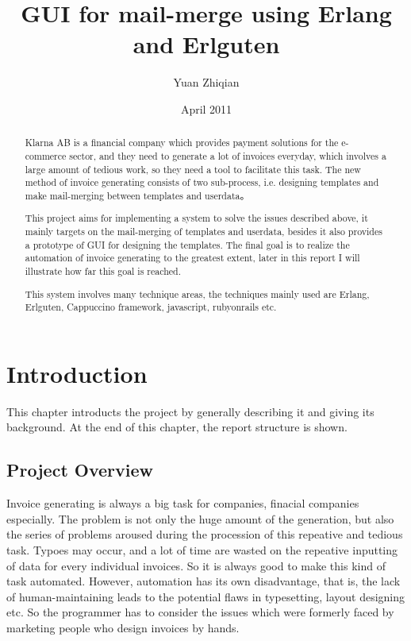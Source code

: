 \documentclass[12pt,twoside,a4paper]{report}
\begin{document}
\title{GUI for mail-merge using Erlang and Erlguten}
\author{Yuan Zhiqian}
\date{April 2011}
\maketitle
\cleardoublepage
\begin{abstract}
  Klarna AB is a financial company which provides payment solutions for the e-commerce sector, and they need to generate a lot of invoices everyday, which involves a large amount of tedious work, so they need a tool to facilitate this task. The new method of invoice generating consists of two sub-process, i.e. designing templates and make mail-merging between templates and userdata。

  This project aims for implementing a system to solve the issues described above, it mainly targets on the mail-merging of templates and userdata, besides it also provides a prototype of GUI for designing the templates. The final goal is to realize the automation of invoice generating to the greatest extent, later in this report I will illustrate how far this goal is reached.

  This system involves many technique areas, the techniques mainly used are Erlang, Erlguten, Cappuccino framework, javascript, rubyonrails etc.
\end{abstract}

\cleardoublepage

\listoffigures
\cleardoublepage
\tableofcontents

\chapter{Introduction}
  This chapter introducts the project by generally describing it and giving its background. At the end of this chapter, the report structure is shown.
\section{Project Overview}
  Invoice generating is always a big task for companies, finacial companies especially. The problem is not only the huge amount of the generation, but also the series of problems aroused during the procession of this repeative and tedious task. Typoes may occur, and a lot of time are wasted on the repeative inputting of data for every individual invoices. So it is always good to make this kind of task automated. However, automation has its own disadvantage, that is, the lack of human-maintaining leads to the potential flaws in typesetting, layout designing etc. So the programmer has to consider the issues which were formerly faced by marketing people who design invoices by hands. 
\end{document}
